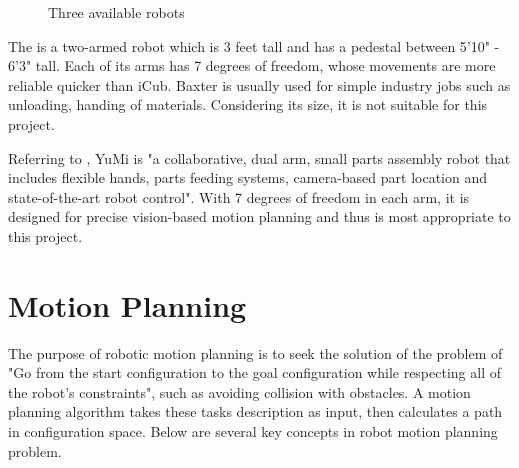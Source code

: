 \begin{figure}[H]
\centering
{}
\caption{Three available robots}
\label{robot}
\end{figure}

The \citep{baxter} is a two-armed robot which is 3 feet tall and has a pedestal between 5'10" - 6'3" tall. Each of its arms has 7 degrees of freedom, whose movements are more reliable quicker than iCub. Baxter is usually used for simple industry jobs such as unloading, handing of materials. Considering its size, it is not suitable for this project. 

Referring to \citep{ABBsDual5:online}, YuMi is "a collaborative, dual arm, small parts assembly robot that includes flexible hands, parts feeding systems, camera-based part location and state-of-the-art robot control". With 7 degrees of freedom in each arm, it is designed for precise vision-based motion planning and thus is most appropriate to this project.

\section{Motion Planning} \label{backgroundmp}
The purpose of robotic motion planning is to seek the solution of the problem of "Go from the start configuration to the goal configuration while respecting all of the robot's constraints", such as avoiding collision with obstacles. A motion planning algorithm takes these tasks description as input, then calculates a path in configuration space. Below are several key concepts in robot motion planning problem.


